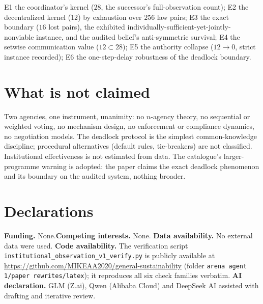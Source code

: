 \documentclass[10pt,twocolumn]{article}
\theoremstyle{definition}
\begin{document}
E1 the coordinator's kernel ($28$, the successor's full-observation
count); E2 the decentralized kernel ($12$) by exhaustion over $256$ law
pairs; E3 the exact boundary ($16$ lost pairs), the exhibited
individually-sufficient-yet-jointly-nonviable instance, and the audited
belief's anti-symmetric survival; E4 the setwise communication value
($12\subset28$); E5 the authority collapse ($12\to0$, strict instance
recorded); E6 the one-step-delay robustness of the deadlock boundary.

\section{What is not claimed}

Two agencies, one instrument, unanimity: no $n$-agency theory, no
sequential or weighted voting, no mechanism design, no enforcement or
compliance dynamics, no negotiation models. The deadlock protocol is the
simplest common-knowledge discipline; procedural alternatives (default
rules, tie-breakers) are not classified. Institutional effectiveness is
not estimated from data. The catalogue's larger-programme warning is
adopted: the paper claims the exact deadlock phenomenon and its boundary
on the audited system, nothing broader.


\section*{Declarations}
\textbf{Funding.} None.\quad \textbf{Competing interests.} None.\quad
\textbf{Data availability.} No external data were used.\quad
\textbf{Code availability.} The verification script
\texttt{institutional\_observation\_v1\_verify.py} is publicly available at
\url{https://github.com/MIKEAA2020/general-sustainability} (folder
\texttt{arena agent 1/paper rewrites/latex}); it reproduces all six check
families verbatim.\quad
\textbf{AI declaration.} GLM (Z.ai), Qwen (Alibaba Cloud) and DeepSeek AI
assisted with drafting and iterative review.
\end{document}
